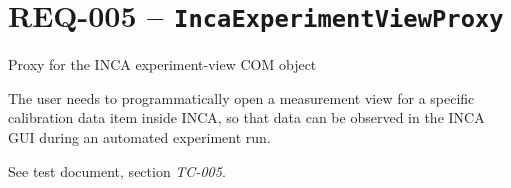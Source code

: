 \section{REQ-005 -- \texttt{IncaExperimentViewProxy}}
\label{sec:incaexperimentviewproxy}

 Proxy for the INCA experiment-view COM object 

\medskip
{}
The user needs to programmatically open a measurement view for a specific calibration
data item inside INCA, so that data can be observed in the INCA GUI during an automated
experiment run.

\medskip
{}

\medskip
{}
See test document, section \textit{TC-005}.